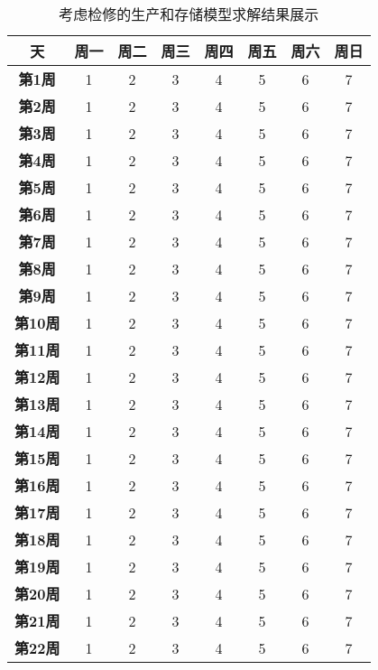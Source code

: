 \begin{table}[H]
    \renewcommand\arraystretch{1.5} 
    \centering
    \caption{考虑检修的生产和存储模型求解结果展示}
    \label{T.ch4-2}
    \xiaowu
    \begin{tabular}{|c|c|c|c|c|c|c|c|}
    \hline
    \textbf{天} & \textbf{周一} & \textbf{周二} & \textbf{周三} & \textbf{周四} & \textbf{周五} & \textbf{周六} & \textbf{周日} \\ \hline
    \textbf{第1周}  & 1 & 2 & 3 & 4 & 5 & 6 & 7 \\ \hline
    \textbf{第2周}  & 1 & 2 & 3 & 4 & 5 & 6 & 7 \\ \hline
    \textbf{第3周}  & 1 & 2 & 3 & 4 & 5 & 6 & 7 \\ \hline
    \textbf{第4周}  & 1 & 2 & 3 & 4 & 5 & 6 & 7 \\ \hline
    \textbf{第5周}  & 1 & 2 & 3 & 4 & 5 & 6 & 7 \\ \hline
    \textbf{第6周}  & 1 & 2 & 3 & 4 & 5 & 6 & 7 \\ \hline
    \textbf{第7周}  & 1 & 2 & 3 & 4 & 5 & 6 & 7 \\ \hline
    \textbf{第8周}  & 1 & 2 & 3 & 4 & 5 & 6 & 7 \\ \hline
    \textbf{第9周}  & 1 & 2 & 3 & 4 & 5 & 6 & 7 \\ \hline
    \textbf{第10周}  & 1 & 2 & 3 & 4 & 5 & 6 & 7 \\ \hline
    \textbf{第11周}  & 1 & 2 & 3 & 4 & 5 & 6 & 7 \\ \hline
    \textbf{第12周}  & 1 & 2 & 3 & 4 & 5 & 6 & 7 \\ \hline
    \textbf{第13周}  & 1 & 2 & 3 & 4 & 5 & 6 & 7 \\ \hline
    \textbf{第14周}  & 1 & 2 & 3 & 4 & 5 & 6 & 7 \\ \hline
    \textbf{第15周}  & 1 & 2 & 3 & 4 & 5 & 6 & 7 \\ \hline
    \textbf{第16周}  & 1 & 2 & 3 & 4 & 5 & 6 & 7 \\ \hline
    \textbf{第17周}  & 1 & 2 & 3 & 4 & 5 & 6 & 7 \\ \hline
    \textbf{第18周}  & 1 & 2 & 3 & 4 & 5 & 6 & 7 \\ \hline
    \textbf{第19周}  & 1 & 2 & 3 & 4 & 5 & 6 & 7 \\ \hline
    \textbf{第20周}  & 1 & 2 & 3 & 4 & 5 & 6 & 7 \\ \hline
    \textbf{第21周}  & 1 & 2 & 3 & 4 & 5 & 6 & 7 \\ \hline
    \textbf{第22周}  & 1 & 2 & 3 & 4 & 5 & 6 & 7 \\ \hline

\end{tabular}
\end{table}
